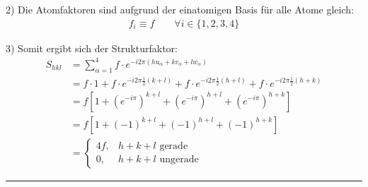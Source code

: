 \documentclass{article}
\newcommand{\lr}[1]{\left(#1\right)}
\newcommand{\lreck}[1]{\left[#1\right]}
\begin{document}
{	2) Die Atomfaktoren sind aufgrund der einatomigen Basis für alle Atome gleich:
		\begin{align*}
			f_i \equiv f \qquad \forall i \in \{1,2,3,4\}
		\end{align*}

	3) Somit ergibt sich der Strukturfaktor:
		\begin{align*}
			S_{hkl} &= \sum_{\alpha=1}^4 f \cdot e^{ -i 2\pi (hu_\alpha + kv_\alpha + lw_\alpha) } \\
			&= f \cdot 1 + f \cdot e^{-i 2\pi \frac{1}{2}(k+l)} + f \cdot e^{-i 2\pi \frac{1}{2}(h+l)} + f \cdot e^{-i 2\pi \frac{1}{2}(h+k)} \\
			&= f \lreck{ 1 + \lr{ e^{-i\pi} }^{k+l} + \lr{ e^{-i\pi} }^{h+l} + \lr{ e^{-i\pi} }^{h+k} } \\
			&= f \lreck{ 1 + \lr{ -1 }^{k+l} + \lr{ -1 }^{h+l} + \lr{ -1 }^{h+k} } \\
			&=
			\begin{cases}
				4f, & \text{$h+k+l$ gerade} \\
				0, & \text{$h+k+l$ ungerade}
			\end{cases}
		\end{align*}
\hrule
}


\newpage
\end{document}

